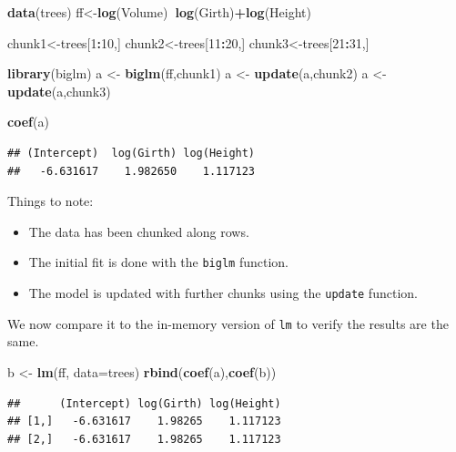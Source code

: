 \documentclass[]{book}
\newenvironment{Shaded}{\begin{snugshade}}{\end{snugshade}}
\newcommand{\DataTypeTok}[1]{\textcolor[rgb]{0.13,0.29,0.53}{#1}}
\newcommand{\DecValTok}[1]{\textcolor[rgb]{0.00,0.00,0.81}{#1}}
\newcommand{\KeywordTok}[1]{\textcolor[rgb]{0.13,0.29,0.53}{\textbf{#1}}}
\newcommand{\NormalTok}[1]{#1}
\newcommand{\OperatorTok}[1]{\textcolor[rgb]{0.81,0.36,0.00}{\textbf{#1}}}
\newcommand{\StringTok}[1]{\textcolor[rgb]{0.31,0.60,0.02}{#1}}
\providecommand{\tightlist}{%
  \setlength{\itemsep}{0pt}\setlength{\parskip}{0pt}}
\theoremstyle{definition}
\theoremstyle{definition}
\theoremstyle{definition}
\theoremstyle{remark}
\begin{document}
\begin{Shaded}
\begin{Highlighting}[]
\KeywordTok{data}\NormalTok{(trees)}
\NormalTok{ff<-}\KeywordTok{log}\NormalTok{(Volume)}\OperatorTok{~}\KeywordTok{log}\NormalTok{(Girth)}\OperatorTok{+}\KeywordTok{log}\NormalTok{(Height)}

\NormalTok{chunk1<-trees[}\DecValTok{1}\OperatorTok{:}\DecValTok{10}\NormalTok{,]}
\NormalTok{chunk2<-trees[}\DecValTok{11}\OperatorTok{:}\DecValTok{20}\NormalTok{,]}
\NormalTok{chunk3<-trees[}\DecValTok{21}\OperatorTok{:}\DecValTok{31}\NormalTok{,]}

\KeywordTok{library}\NormalTok{(biglm)}
\NormalTok{a <-}\StringTok{ }\KeywordTok{biglm}\NormalTok{(ff,chunk1)}
\NormalTok{a <-}\StringTok{ }\KeywordTok{update}\NormalTok{(a,chunk2)}
\NormalTok{a <-}\StringTok{ }\KeywordTok{update}\NormalTok{(a,chunk3)}

\KeywordTok{coef}\NormalTok{(a)}
\end{Highlighting}
\end{Shaded}

\begin{verbatim}
## (Intercept)  log(Girth) log(Height) 
##   -6.631617    1.982650    1.117123
\end{verbatim}

Things to note:

\begin{itemize}
\tightlist
\item
  The data has been chunked along rows.
\item
  The initial fit is done with the \texttt{biglm} function.
\item
  The model is updated with further chunks using the \texttt{update} function.
\end{itemize}

We now compare it to the in-memory version of \texttt{lm} to verify the results are the same.

\begin{Shaded}
\begin{Highlighting}[]
\NormalTok{b <-}\StringTok{ }\KeywordTok{lm}\NormalTok{(ff, }\DataTypeTok{data=}\NormalTok{trees)}
\KeywordTok{rbind}\NormalTok{(}\KeywordTok{coef}\NormalTok{(a),}\KeywordTok{coef}\NormalTok{(b))}
\end{Highlighting}
\end{Shaded}

\begin{verbatim}
##      (Intercept) log(Girth) log(Height)
## [1,]   -6.631617    1.98265    1.117123
## [2,]   -6.631617    1.98265    1.117123
\end{verbatim}
\end{document}
